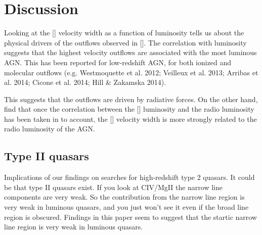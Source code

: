 \section{Discussion}

Looking at the [] velocity width as a function of luminosity tells us about the physical drivers of the outflows observed in []. 
The correlation with luminosity suggests that the highest velocity outflows are associated with the most luminous \ac{AGN}. 
This has been reported for low-redshift \ac{AGN}, for both ionized and molecular outflows (e.g. Westmoquette et al. 2012; Veilleux et al. 2013; Arribas et al. 2014; Cicone et al. 2014; Hill \& Zakamska 2014).

This suggests that the outflows are driven by radiative forces. 
On the other hand, \citet{mullaney13} find that once the correlation between the [] luminosity and the radio luminosity has been taken in to account, the [] velocity width is more strongly related to the radio luminosity of the \ac{AGN}. 

\subsection{Type II quasars}

Implications of our findings on searches for high-redshift type 2 quasars. It could be that type II quasars exist. If you look at CIV/MgII the narrow line components are very weak. So the contribution from the narrow line region is very weak in luminous quasars, and you just won't see it even if the broad line region is obscured.
Findings in this paper seem to suggest that the startic narrow line region is very weak in luminous quasars. 


